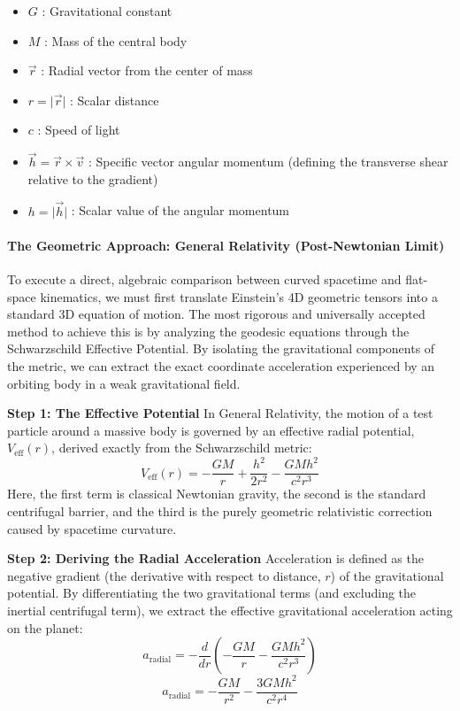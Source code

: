\documentclass[
]{article}
\providecommand{\tightlist}{%
  \setlength{\itemsep}{0pt}\setlength{\parskip}{0pt}}
\begin{document}
\begin{itemize}
\tightlist
\item
  \(G\) : Gravitational constant
\item
  \(M\) : Mass of the central body
\item
  \(\vec{r}\) : Radial vector from the center of mass
\item
  \(r = \lvert \vec{r} \rvert\) : Scalar distance
\item
  \(c\) : Speed of light
\item
  \(\vec{h} = \vec{r} \times \vec{v}\) : Specific vector angular
  momentum (defining the transverse shear relative to the gradient)
\item
  \(h = \lvert \vec{h} \rvert\) : Scalar value of the angular momentum
\end{itemize}

\paragraph{The Geometric Approach: General Relativity (Post-Newtonian
Limit)}\label{the-geometric-approach-general-relativity-post-newtonian-limit}

To execute a direct, algebraic comparison between curved spacetime and
flat-space kinematics, we must first translate Einstein's 4D geometric
tensors into a standard 3D equation of motion. The most rigorous and
universally accepted method to achieve this is by analyzing the geodesic
equations through the Schwarzschild Effective Potential. By isolating
the gravitational components of the metric, we can extract the exact
coordinate acceleration experienced by an orbiting body in a weak
gravitational field.

\textbf{Step 1: The Effective Potential} In General Relativity, the
motion of a test particle around a massive body is governed by an
effective radial potential, \(V_{\text{eff}}(r)\), derived exactly from
the Schwarzschild metric:
\[V_{\text{eff}}(r) = -\frac{GM}{r} + \frac{h^2}{2r^2} - \frac{GMh^2}{c^2r^3}\]
Here, the first term is classical Newtonian gravity, the second is the
standard centrifugal barrier, and the third is the purely geometric
relativistic correction caused by spacetime curvature.

\textbf{Step 2: Deriving the Radial Acceleration} Acceleration is
defined as the negative gradient (the derivative with respect to
distance, \(r\)) of the gravitational potential. By differentiating the
two gravitational terms (and excluding the inertial centrifugal term),
we extract the effective gravitational acceleration acting on the
planet:
\[a_{\text{radial}} = -\frac{d}{dr} \left( -\frac{GM}{r} - \frac{GMh^2}{c^2r^3} \right)\]
\[a_{\text{radial}} = -\frac{GM}{r^2} - \frac{3GMh^2}{c^2r^4}\]
\end{document}
